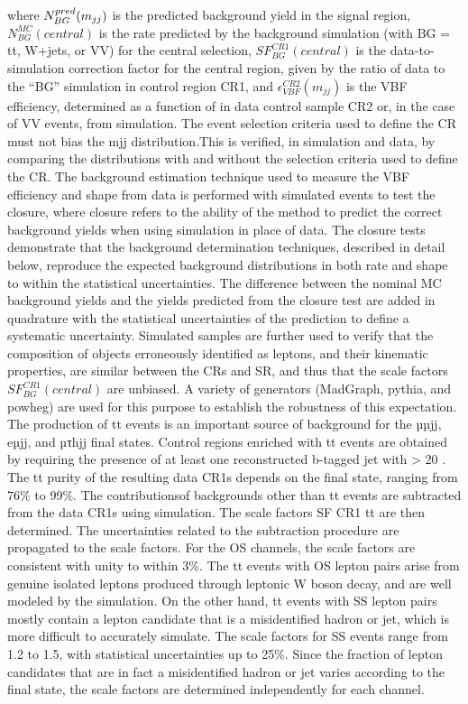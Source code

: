 where $N^{pred}_{BG}(m_{jj})$ is the predicted background yield in the signal region, $N^{MC}_{BG}(central)$ is the rate predicted by the background simulation (with BG = tt, W+jets, or VV) for the central
selection, $SF^{CR1}_{BG}(central)$ is the data-to-simulation correction factor for the central region, given by the ratio of data to the “BG” simulation in control region CR1, and $\epsilon^{CR2}_{VBF}(m_{jj})$  is the VBF efficiency, determined as a function of \mjj in data control sample CR2 or, in the case of VV events, from simulation. 
The event selection criteria used to define the CR must not bias the mjj distribution.This is verified, in simulation and data, by comparing the \mjj distributions with and without the selection criteria used to define the CR. The background estimation technique used to measure the VBF efficiency and \mjj shape from data is performed with simulated events to test the closure, where closure refers to the ability of the method to predict the correct background yields when using simulation in place of data. The closure tests demonstrate that the background determination techniques, described in detail below, reproduce the expected background distributions in both rate and shape to within the statistical uncertainties. The difference between the nominal MC background yields and the yields predicted from the closure test are added in quadrature with the statistical uncertainties of the prediction to define a systematic uncertainty. Simulated samples are further used to verify that the composition of objects erroneously identified as leptons, and their kinematic properties, are similar between the CRs and SR, and thus that the scale factors $SF^{CR1}_{BG}(central)$ are unbiased. A variety of generators (MadGraph, pythia, and powheg) are used for this purpose to establish the robustness of this expectation. 
The production of tt events is an important source of background for the µµjj, eµjj, and µτhjj final states. Control regions enriched with tt events are obtained by requiring the presence of at least one reconstructed b-tagged jet with \pt > 20 \gev. The tt purity of the resulting data CR1s depends on the final state, ranging from 76\% to 99\%. The contributionsof backgrounds other than tt events are subtracted from the data CR1s using simulation. The scale factors SF CR1 tt are then determined. The uncertainties related to the subtraction procedure are propagated to the scale factors. For the OS channels, the scale factors are consistent with unity to within 3\%. The tt events with OS lepton pairs arise from genuine isolated leptons produced through leptonic W boson decay, and are well modeled by the simulation. On the other hand, tt events with SS lepton pairs mostly contain a lepton candidate that is a misidentified hadron or jet, which is more difficult to accurately simulate. The scale factors for SS events range from 1.2 to 1.5, with statistical uncertainties up to 25\%. Since the fraction of lepton candidates that are in fact a misidentified hadron or jet varies according to the final state, the scale factors are determined independently for each channel.
